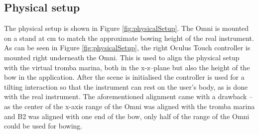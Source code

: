 \documentclass[dvipsnames, pdftex]{article}
\begin{document}

\subsection{Physical setup}\label{subsec:physicalSetup}
The physical setup is shown in Figure \ref{fig:physicalSetup}. The Omni is mounted on a stand at  cm to match the approximate bowing height of the real instrument. As can be seen in Figure \ref{fig:physicalSetup}, the right Oculus Touch controller is mounted right underneath the Omni. This is used to align the physical setup with the virtual tromba marina, both in the x-z--plane but also the height of the bow in the application. After the scene is initialised the controller is used for a tilting interaction so that the instrument can rest on the user's body, as is done with the real instrument. The aforementioned alignment came with a drawback -- as the center of the x-axis range of the Omni was aligned with the tromba marina and B2 was aligned with one end of the bow, only half of the range of the Omni could be used for bowing.
\end{document}
